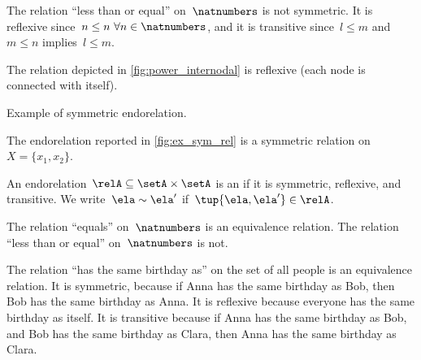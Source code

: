 \begin{example}
  The relation ``less than or equal'' on~$\natnumbers$ is not symmetric. It is reflexive since~$n\leq n \ \forall n\in \natnumbers$, and it is transitive since~$l\leq m$ and~$m\leq n$ implies~$l\leq m$.
\end{example}

\begin{example}
  The relation depicted in \cref{fig:power_internodal} is reflexive (each node is connected with itself).
\end{example}
\begin{marginfigure}
    \begin{center}
    \end{center}
    \caption{Example of symmetric endorelation.}
    \label{fig:ex_sym_rel}
  \end{marginfigure}
\begin{example}
  The endorelation reported in \cref{fig:ex_sym_rel} is a symmetric relation on~$X=\{x_1,x_2\}$.

\end{example}



\begin{definition}
  \label{def:equivalence-relation}
  An endorelation~$\relA\subseteq \setA\times \setA$ is an \emph{} if it is symmetric, reflexive, and transitive. We write~$\ela\sim \ela'$ if~$\tup{\ela,\ela'}\in \relA$.
\end{definition}

\begin{example}
  The relation ``equals'' on~$\natnumbers$ is an equivalence relation.
  The relation ``less than or equal'' on~$\natnumbers$ is not.
\end{example}

\begin{example}
  The relation ``has the same birthday as'' on the set of all people is an equivalence relation.
  It is symmetric, because if Anna has the same birthday as Bob, then Bob has the same birthday as Anna.
  It is reflexive because everyone has the same birthday as itself.
  It is transitive because if Anna has the same birthday as Bob, and Bob has the same birthday as Clara, then Anna has the same birthday as Clara.
\end{example}

